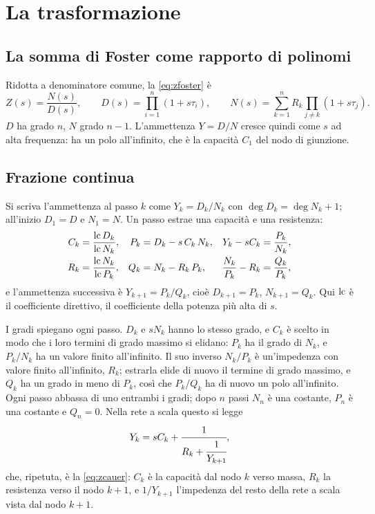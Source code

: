 \documentclass[10pt,a4paper]{scrartcl}
\let\newcommand\fcitdefine
\newcommand{\lc}{\operatorname{lc}}
\begin{document}
\section{La trasformazione}
\label{sec:transform}

\subsection{La somma di Foster come rapporto di polinomi}
Ridotta a denominatore comune, la \eqref{eq:zfoster} è
\begin{equation}
Z(s) = \frac{N(s)}{D(s)} , \qquad D(s) = \prod_{i=1}^{n} (1 + s\tau_i) , \qquad N(s) = \sum_{k=1}^{n} R_k \prod_{j \neq k} (1 + s\tau_j) .
\label{eq:nd}
\end{equation}
$D$ ha grado $n$, $N$ grado $n-1$. L'ammettenza $Y = D/N$ cresce quindi come $s$ ad alta frequenza: ha un polo all'infinito, che è la capacità $C_1$ del nodo di giunzione.

\subsection{Frazione continua}
\label{sec:cf}
Si scriva l'ammettenza al passo $k$ come $Y_k = D_k/N_k$ con $\deg D_k = \deg N_k + 1$; all'inizio $D_1 = D$ e $N_1 = N$. Un passo estrae una capacità e una resistenza:
\begin{align}
C_k &= \frac{\lc D_k}{\lc N_k} , & P_k &= D_k - s\,C_k\, N_k , & Y_k - sC_k &= \frac{P_k}{N_k} , \label{eq:stepC}\\
R_k &= \frac{\lc N_k}{\lc P_k} , & Q_k &= N_k - R_k\, P_k , & \frac{N_k}{P_k} - R_k &= \frac{Q_k}{P_k} , \label{eq:stepR}
\end{align}
e l'ammettenza successiva è $Y_{k+1} = P_k/Q_k$, cioè $D_{k+1} = P_k$, $N_{k+1} = Q_k$. Qui $\lc$ è il coefficiente direttivo, il coefficiente della potenza più alta di $s$.

I gradi spiegano ogni passo. $D_k$ e $sN_k$ hanno lo stesso grado, e $C_k$ è scelto in modo che i loro termini di grado massimo si elidano: $P_k$ ha il grado di $N_k$, e $P_k/N_k$ ha un valore finito all'infinito. Il suo inverso $N_k/P_k$ è un'impedenza con valore finito all'infinito, $R_k$; estrarla elide di nuovo il termine di grado massimo, e $Q_k$ ha un grado in meno di $P_k$, così che $P_k/Q_k$ ha di nuovo un polo all'infinito. Ogni passo abbassa di uno entrambi i gradi; dopo $n$ passi $N_n$ è una costante, $P_n$ è una costante e $Q_n = 0$. Nella rete a scala questo si legge
\begin{equation}
Y_k = sC_k + \cfrac{1}{R_k + \cfrac{1}{Y_{k+1}}} ,
\end{equation}
che, ripetuta, è la \eqref{eq:zcauer}: $C_k$ è la capacità dal nodo $k$ verso massa, $R_k$ la resistenza verso il nodo $k+1$, e $1/Y_{k+1}$ l'impedenza del resto della rete a scala vista dal nodo $k+1$.
\end{document}
